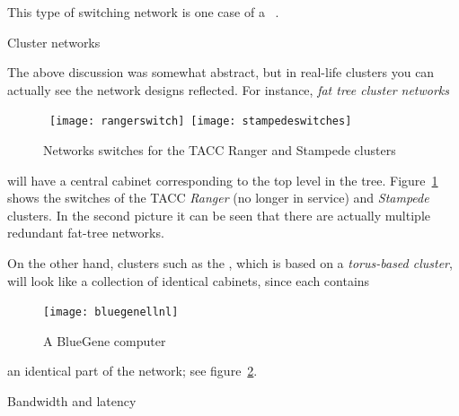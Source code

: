 This type of switching network is one case of a ~\cite{Clos1953}.


 {Cluster networks}

The above discussion was somewhat abstract, but in real-life clusters
you can actually see the network designs reflected. For instance,
\emph{fat tree cluster networks}
\begin{figure}[th]
  \hbox{%
    \texttt{[image: rangerswitch]}\kern1cm
    \texttt{[image: stampedeswitches]}%
  }
  \caption{Networks switches for the TACC Ranger and Stampede clusters}
  \label{fig:taccswitches}
\end{figure}
will have a central cabinet corresponding to the top level in the tree.
Figure~\ref{fig:taccswitches} shows the switches of the TACC
\emph{Ranger} (no longer in service)
and \emph{Stampede} clusters.
In the second picture it can be seen that there are actually
multiple redundant fat-tree networks.

On the other hand, clusters such as the ,
which is based on a \emph{torus-based cluster},
will look like a collection of identical cabinets, since each contains
\begin{figure}[th]
  \texttt{[image: bluegenellnl]}
  \caption{A BlueGene computer}
  \label{fig:bluegenep}
\end{figure}
an identical part of the network; see figure~\ref{fig:bluegenep}.

 {Bandwidth and latency}
\label{sec:bwlatency}


